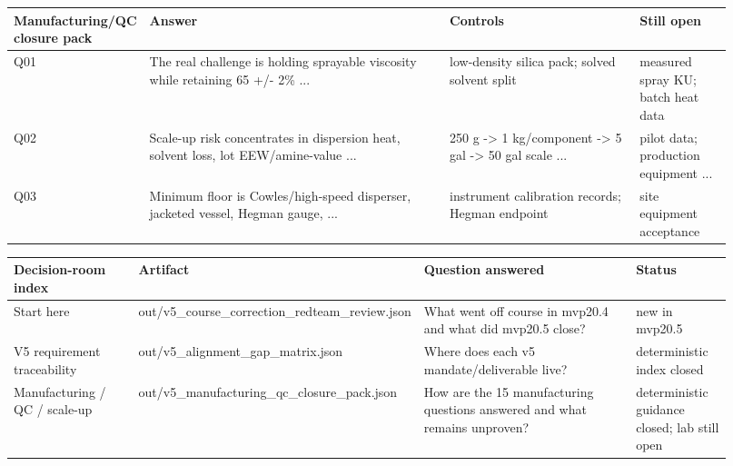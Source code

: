 \documentclass[10pt]{article}
\begin{document}
{\scriptsize\begin{longtable}{@{}p{0.09\linewidth} p{0.43\linewidth} p{0.27\linewidth} p{0.13\linewidth}@{}}\toprule \textbf{Manufacturing/QC closure pack} & \textbf{Answer} & \textbf{Controls} & \textbf{Still open} \\ \midrule Q01 & The real challenge is holding sprayable viscosity while retaining 65 +/- 2\% ... & low-density silica pack; solved solvent split & measured spray KU; batch heat data \\ Q02 & Scale-up risk concentrates in dispersion heat, solvent loss, lot EEW/amine-value ... & 250 g -> 1 kg/component -> 5 gal -> 50 gal scale ... & pilot data; production equipment ... \\ Q03 & Minimum floor is Cowles/high-speed disperser, jacketed vessel, Hegman gauge, ... & instrument calibration records; Hegman endpoint & site equipment acceptance \\ \bottomrule\end{longtable}}
{\scriptsize\begin{longtable}{@{}p{0.19\linewidth} p{0.25\linewidth} p{0.34\linewidth} p{0.14\linewidth}@{}}\toprule \textbf{Decision-room index} & \textbf{Artifact} & \textbf{Question answered} & \textbf{Status} \\ \midrule Start here & out/v5\_course\_correction\_redteam\_review.json & What went off course in mvp20.4 and what did mvp20.5 close? & new in mvp20.5 \\ V5 requirement traceability & out/v5\_alignment\_gap\_matrix.json & Where does each v5 mandate/deliverable live? & deterministic index closed \\ Manufacturing / QC / scale-up & out/v5\_manufacturing\_qc\_closure\_pack.json & How are the 15 manufacturing questions answered and what remains unproven? & deterministic guidance closed; lab still open \\ \bottomrule\end{longtable}}
\end{document}
